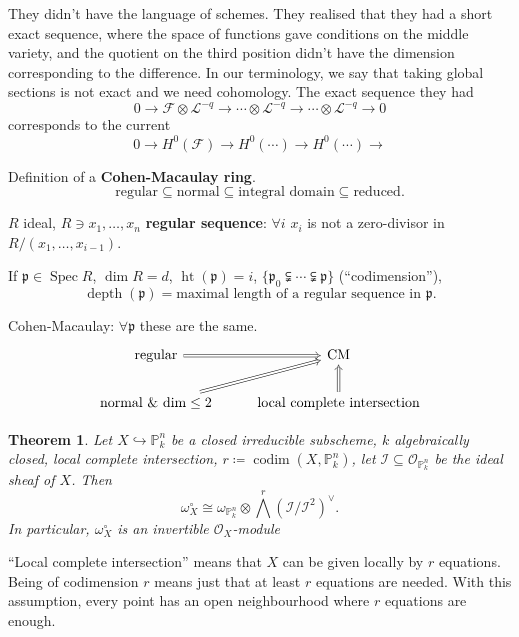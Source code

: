 \documentclass[12pt]{article}
\DeclareMathOperator{\Spec}{Spec}
\DeclareMathOperator{\codim}{codim}
\DeclareMathOperator{\height}{ht}
\DeclareMathOperator{\depth}{depth}
\newtheorem*{theorem}{Theorem}
\theoremstyle{definition}
\begin{document}
They didn't have the language of schemes. They realised that they had a short exact sequence, where the space of functions gave conditions on the middle variety, and the quotient on the third position didn't have the dimension corresponding to the difference. In our terminology, we say that taking global sections is not exact and we need cohomology. The exact sequence they had
\[0\longrightarrow\mathcal{F}\otimes\mathcal{L}^{-q}\longrightarrow\cdots\otimes\mathcal{L}^{-q}\longrightarrow\cdots\otimes\mathcal{L}^{-q}\longrightarrow0\]
corresponds to the current
\[0\longrightarrow H^0(\mathcal{F})\longrightarrow H^0(\cdots)\longrightarrow H^0(\cdots)\longrightarrow\]

Definition of a \textbf{Cohen-Macaulay ring}.
\[\text{regular}\subseteq\text{normal}\subseteq\text{integral domain}\subseteq\text{reduced}.\]

$R$ ideal, $R\ni x_1,\ldots,x_n$ \textbf{regular sequence}: $\forall i$ $x_i$ is not a zero-divisor in $R/(x_1,\ldots,x_{i-1})$.

If $\mathfrak{p}\in\Spec R$, $\dim R=d$, $\height(\mathfrak{p})=i$, $\{\mathfrak{p}_0\subsetneqq\cdots\subsetneqq\mathfrak{p}\}$ (``codimension''),
\[\depth(\mathfrak{p})=\text{maximal length of a regular sequence in }\mathfrak{p}.\]

Cohen-Macaulay: $\forall\mathfrak{p}$ these are the same.
\[
\begin{tikzcd}
\text{regular}\arrow[r,Rightarrow]&\text{CM}\\
\text{normal \& dim}\leq2\arrow[ru,Rightarrow]&\text{local complete intersection}\arrow[u,Rightarrow]
\end{tikzcd}
\]

\begin{theorem}
Let $X\hookrightarrow\mathbb{P}_k^n$ be a closed irreducible subscheme, $k$ algebraically closed, local complete intersection, $r\coloneqq\codim(X,\mathbb{P}_k^n)$, let $\mathcal{I}\subseteq\mathcal{O}_{\mathbb{P}_k^n}$ be the ideal sheaf of $X$. Then
\[\omega_X^{\circ}\cong\omega_{\mathbb{P}_k^n}\otimes{\bigwedge}^r(\mathcal{I}/\mathcal{I}^2)^{\vee}.\]
In particular, $\omega_X^{\circ}$ is an invertible $\mathcal{O}_X$-module
\end{theorem}

``Local complete intersection'' means that $X$ can be given locally by $r$ equations. Being of codimension $r$ means just that at least $r$ equations are needed. With this assumption, every point has an open neighbourhood where $r$ equations are enough.
\end{document}
